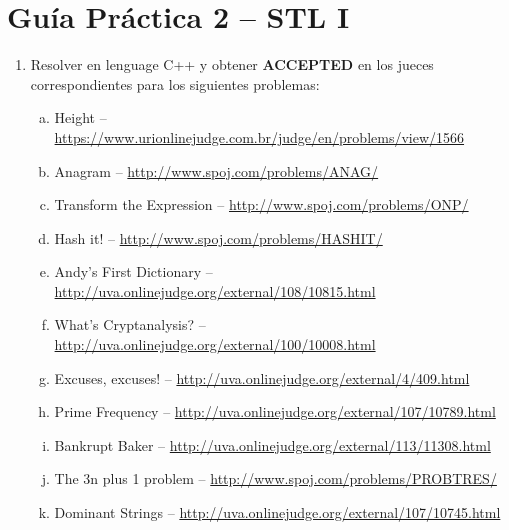 




\section*{Gu\'ia Pr\'actica 2 -- STL I}

\begin{enumerate}[1 -]
	
	\item Resolver en lenguage C++ y obtener \textbf{ACCEPTED} en los jueces correspondientes para los siguientes problemas:
	
	\begin{enumerate}[a)]
		
		\item Height -- \href{https://www.urionlinejudge.com.br/judge/en/problems/view/1566}{https://www.urionlinejudge.com.br/judge/en/problems/view/1566	}	
		\item Anagram -- \href{http://www.spoj.com/problems/ANAG/}{http://www.spoj.com/problems/ANAG/}
		\item Transform the Expression -- \href{http://www.spoj.com/problems/ONP/}{http://www.spoj.com/problems/ONP/}
		\item Hash it! -- \href{http://www.spoj.com/problems/HASHIT/}{http://www.spoj.com/problems/HASHIT/}
		\item Andy’s First Dictionary -- \href{http://uva.onlinejudge.org/external/108/10815.html}{http://uva.onlinejudge.org/external/108/10815.html}
		\item What's Cryptanalysis? -- \href{http://uva.onlinejudge.org/external/100/10008.html}{http://uva.onlinejudge.org/external/100/10008.html}
		\item Excuses, excuses! -- \href{http://uva.onlinejudge.org/external/4/409.html}{http://uva.onlinejudge.org/external/4/409.html}
		\item Prime Frequency -- \href{http://uva.onlinejudge.org/external/107/10789.html}{http://uva.onlinejudge.org/external/107/10789.html}
		\item Bankrupt Baker -- \href{http://uva.onlinejudge.org/external/113/11308.html}{http://uva.onlinejudge.org/external/113/11308.html}
		\item The 3n plus 1 problem -- \href{http://www.spoj.com/problems/PROBTRES/}{http://www.spoj.com/problems/PROBTRES/}
		\item Dominant Strings -- \href{http://uva.onlinejudge.org/external/107/10745.html}{http://uva.onlinejudge.org/external/107/10745.html}		
	\end{enumerate}

\end{enumerate}






